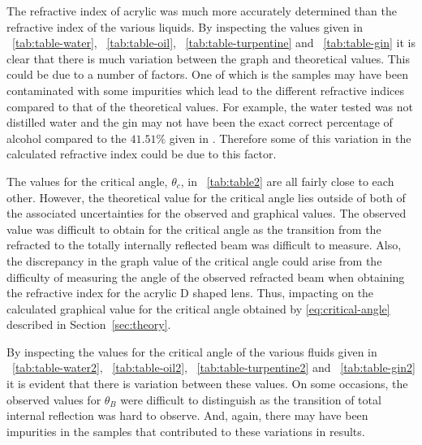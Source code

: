 \documentclass{article}
\newcommand{\tabref}[2][\tablename~]{#1\ref{#2}}
\newcommand{\secref}[2][Section~]{#1\ref{#2}}
\begin{document}
\vspace{2mm}
\noindent
The refractive index of acrylic was much more accurately determined than the refractive index of the various liquids. By inspecting the values given in \tabref{tab:table-water}, \tabref{tab:table-oil}, \tabref{tab:table-turpentine} and \tabref{tab:table-gin} it is clear that there is much variation between the graph and theoretical values. This could be due to a number of factors. One of which is the samples may have been contaminated with some impurities which lead to the different refractive indices compared to that of the theoretical values. For example, the water tested was not distilled water and the gin may not have been the exact correct percentage of alcohol compared to the $41.51\%$ given in \cite{Web02}. Therefore some of this variation in the calculated refractive index could be due to this factor. 

\vspace{2mm}
\noindent
The values for the critical angle, $\theta_c$, in \tabref{tab:table2} are all fairly close to each other. However, the theoretical value for the critical angle lies outside of both of the associated uncertainties for the observed and graphical values. The observed value was difficult to obtain for the critical angle as the transition from the refracted to the totally internally reflected beam was difficult to measure. Also, the discrepancy in the graph value of the critical angle could arise from the difficulty of measuring the angle of the observed refracted beam when obtaining the refractive index for the acrylic D shaped lens. Thus, impacting on the calculated graphical value for the critical angle obtained by \eqref{eq:critical-angle} described in \secref{sec:theory}.

\vspace{2mm}
\noindent
By inspecting the values for the critical angle of the various fluids given in \tabref{tab:table-water2}, \tabref{tab:table-oil2}, \tabref{tab:table-turpentine2} and \tabref{tab:table-gin2} it is evident that there is variation between these values. On some occasions, the observed values for $\theta_B$ were difficult to distinguish as the transition of total internal reflection was hard to observe. And, again, there may have been impurities in the samples that contributed to these variations in results. 
\end{document}
